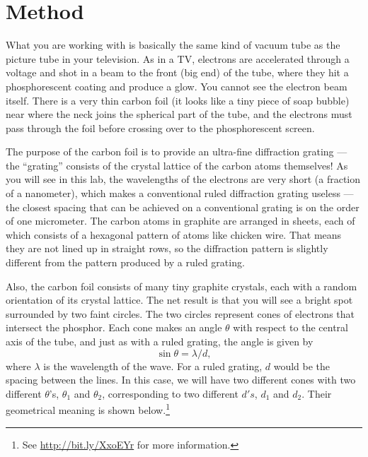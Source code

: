 \section*{Method}

What you are working with is basically the same kind of
vacuum tube as the picture tube in your television. As in a
TV, electrons are accelerated through a voltage and shot in
a beam to the front (big end) of the tube, where they hit a
phosphorescent coating and produce a glow. You cannot see
the electron beam itself. There is a very thin carbon foil
(it looks like a tiny piece of soap bubble) near where the
neck joins the spherical part of the tube, and the electrons
must pass through the foil before crossing over to the
phosphorescent screen.

The purpose of the carbon foil is to provide an ultra-fine
diffraction grating --- the ``grating'' consists of the
crystal lattice of the carbon atoms themselves! As you will
see in this lab, the wavelengths of the electrons are very
short (a fraction of a nanometer), which makes a conventional
ruled diffraction grating useless --- the closest spacing
that can be achieved on a conventional grating is on the
order of one micrometer. The carbon atoms in graphite are
arranged in sheets, each of which consists of a hexagonal
pattern of atoms like chicken wire. That means they are not
lined up in straight rows, so the diffraction pattern is
slightly different from the pattern produced by a ruled grating.

Also, the carbon foil consists of many tiny graphite
crystals, each with a random orientation of its crystal
lattice. The net result is that you will see a bright spot
surrounded by two faint circles. The two circles represent
cones of electrons that intersect the phosphor. Each cone
makes an angle $\theta $ with respect to the central axis of
the tube, and just as with a ruled grating, the angle is given by
\begin{equation*}
         \sin\theta   =  \lambda /d,
\end{equation*}
where $\lambda $ is the wavelength of the wave. For a ruled
grating, $d$ would be the spacing between the lines. In this
case, we will have two different cones with two different
$\theta $'s, $\theta_1$ and $\theta_2$, corresponding to two
different $d's$, $d_1$ and $d_2$. Their geometrical
meaning is shown below.\footnote{See \url{http://bit.ly/XxoEYr} for more information.}


